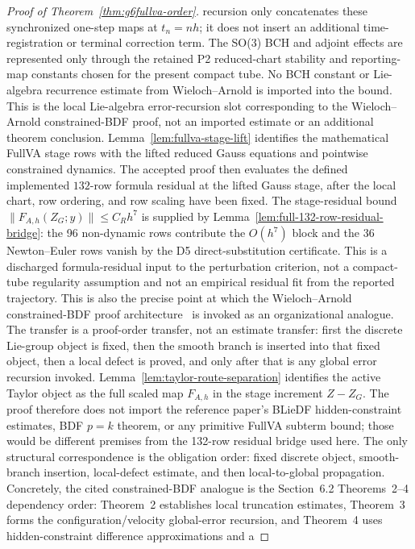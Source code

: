 \documentclass[preprint,12pt]{elsarticle}
\begin{document}
\begin{proof}[Proof of Theorem~\ref{thm:g6fullva-order}]
recursion only concatenates these synchronized one-step maps at
\(t_n=n h\); it does not insert an additional time-registration or terminal
correction term.
The SO(3) BCH and adjoint effects are represented only through the retained P2
reduced-chart stability and reporting-map constants chosen for the present
compact tube. No BCH constant or Lie-algebra recurrence estimate from
Wieloch--Arnold is imported into the bound. This is the local Lie-algebra
error-recursion slot corresponding to the Wieloch--Arnold constrained-BDF proof, not
an imported estimate or an additional theorem conclusion.
Lemma~\ref{lem:fullva-stage-lift} identifies the mathematical FullVA stage
rows with the lifted reduced Gauss equations and pointwise constrained
dynamics. The accepted proof then evaluates the defined implemented
\(132\)-row formula residual at the lifted Gauss stage, after the local chart,
row ordering, and row scaling have been fixed. The stage-residual bound
\(\|F_{A,h}(Z_G;y)\|\le C_Rh^7\) is supplied by
Lemma~\ref{lem:full-132-row-residual-bridge}: the 96 non-dynamic rows
contribute the \(O(h^7)\) block and the 36 Newton--Euler rows vanish by the D5
direct-substitution certificate. This is a discharged formula-residual input
to the perturbation criterion, not a compact-tube regularity assumption and
not an empirical residual fit from the reported trajectory.
This is also the precise point at which the Wieloch--Arnold constrained-BDF
proof architecture~\cite{wieloch2021bdf} is invoked as an
organizational analogue.  The transfer is a proof-order transfer, not an
estimate transfer: first the
discrete Lie-group object is fixed, then the smooth branch is inserted into
that fixed object, then a local defect is proved, and only after that is any
global error recursion invoked.  Lemma~\ref{lem:taylor-route-separation}
identifies the active Taylor object as the full scaled map \(F_{A,h}\) in the
stage increment \(Z-Z_G\).  The proof therefore does not import the reference
paper's BLieDF hidden-constraint estimates, BDF \(p=k\) theorem, or any
primitive FullVA subterm bound; those would be different premises from the
132-row residual bridge used here.  The only structural correspondence is the
obligation order: fixed discrete object, smooth-branch insertion,
local-defect estimate, and then local-to-global propagation.
Concretely, the cited constrained-BDF analogue is the Section~6.2
Theorems~2--4 dependency order: Theorem~2 establishes local truncation
estimates, Theorem~3 forms the configuration/velocity global-error recursion,
and Theorem~4 uses hidden-constraint difference approximations and a

\end{proof}
\end{document}
